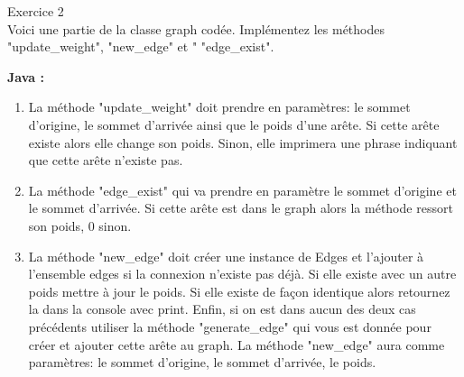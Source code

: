 \begin{Exercice}[20 minutes] Exercice 2\\

Voici une partie de la classe graph codée. Implémentez les méthodes "update\_weight", "new\_edge" et " "edge\_exist".

\textbf{Java :}
         
    \begin{enumerate}
        \item La méthode "update\_weight" doit prendre en paramètres: le sommet d'origine, le sommet d'arrivée ainsi que le poids d'une arête. Si cette arête existe alors elle change son poids. Sinon, elle imprimera une phrase indiquant que cette arête n'existe pas.
        \item La méthode "edge\_exist" qui va prendre en paramètre le sommet d'origine et le sommet d'arrivée. Si cette arête est dans le graph alors la méthode ressort son poids, 0 sinon.
        \item La méthode "new\_edge" doit créer une instance de Edges et l'ajouter à l'ensemble edges si la connexion n'existe pas déjà. Si elle existe avec un autre poids mettre à jour le poids. Si elle existe de façon identique alors retournez la dans la console avec print. Enfin, si on est dans aucun des deux cas précédents utiliser la méthode "generate\_edge" qui vous est donnée pour créer et ajouter cette arête au graph. La méthode "new\_edge" aura comme paramètres: le sommet d'origine, le sommet d'arrivée, le poids.
    \end{enumerate}


\end{Exercice}
